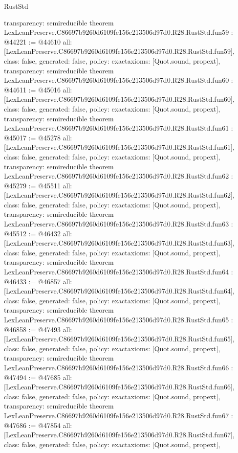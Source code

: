 \begin{lexlean}{RustStd}
\begin{coremodule}
{  transparency: semireducible
}
theorem LexLeanPreserve.C86697b9260d6109fe156e213506d97d0.R28.RustStd.fun59 : @44221 := @44610 {
  all: [LexLeanPreserve.C86697b9260d6109fe156e213506d97d0.R28.RustStd.fun59],
  class: false,
  generated: false,
  policy: exact{axioms: [Quot.sound, propext]},
  transparency: semireducible
}
theorem LexLeanPreserve.C86697b9260d6109fe156e213506d97d0.R28.RustStd.fun60 : @44611 := @45016 {
  all: [LexLeanPreserve.C86697b9260d6109fe156e213506d97d0.R28.RustStd.fun60],
  class: false,
  generated: false,
  policy: exact{axioms: [Quot.sound, propext]},
  transparency: semireducible
}
theorem LexLeanPreserve.C86697b9260d6109fe156e213506d97d0.R28.RustStd.fun61 : @45017 := @45278 {
  all: [LexLeanPreserve.C86697b9260d6109fe156e213506d97d0.R28.RustStd.fun61],
  class: false,
  generated: false,
  policy: exact{axioms: [Quot.sound, propext]},
  transparency: semireducible
}
theorem LexLeanPreserve.C86697b9260d6109fe156e213506d97d0.R28.RustStd.fun62 : @45279 := @45511 {
  all: [LexLeanPreserve.C86697b9260d6109fe156e213506d97d0.R28.RustStd.fun62],
  class: false,
  generated: false,
  policy: exact{axioms: [Quot.sound, propext]},
  transparency: semireducible
}
theorem LexLeanPreserve.C86697b9260d6109fe156e213506d97d0.R28.RustStd.fun63 : @45512 := @46432 {
  all: [LexLeanPreserve.C86697b9260d6109fe156e213506d97d0.R28.RustStd.fun63],
  class: false,
  generated: false,
  policy: exact{axioms: [Quot.sound, propext]},
  transparency: semireducible
}
theorem LexLeanPreserve.C86697b9260d6109fe156e213506d97d0.R28.RustStd.fun64 : @46433 := @46857 {
  all: [LexLeanPreserve.C86697b9260d6109fe156e213506d97d0.R28.RustStd.fun64],
  class: false,
  generated: false,
  policy: exact{axioms: [Quot.sound, propext]},
  transparency: semireducible
}
theorem LexLeanPreserve.C86697b9260d6109fe156e213506d97d0.R28.RustStd.fun65 : @46858 := @47493 {
  all: [LexLeanPreserve.C86697b9260d6109fe156e213506d97d0.R28.RustStd.fun65],
  class: false,
  generated: false,
  policy: exact{axioms: [Quot.sound, propext]},
  transparency: semireducible
}
theorem LexLeanPreserve.C86697b9260d6109fe156e213506d97d0.R28.RustStd.fun66 : @47494 := @47685 {
  all: [LexLeanPreserve.C86697b9260d6109fe156e213506d97d0.R28.RustStd.fun66],
  class: false,
  generated: false,
  policy: exact{axioms: [Quot.sound, propext]},
  transparency: semireducible
}
theorem LexLeanPreserve.C86697b9260d6109fe156e213506d97d0.R28.RustStd.fun67 : @47686 := @47854 {
  all: [LexLeanPreserve.C86697b9260d6109fe156e213506d97d0.R28.RustStd.fun67],
  class: false,
  generated: false,
  policy: exact{axioms: [Quot.sound, propext]},
}
\end{coremodule}
\end{lexlean}
